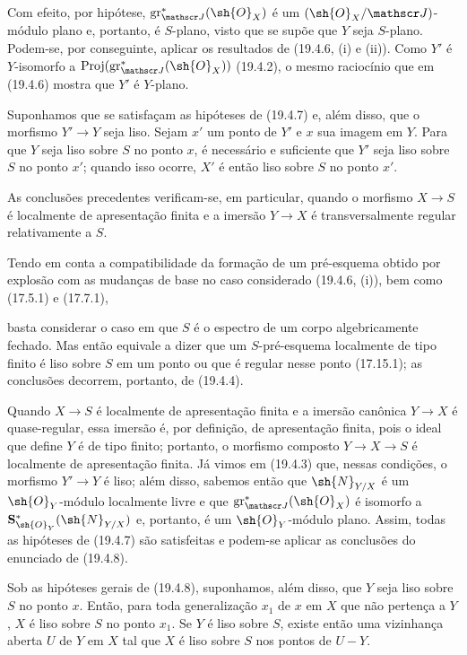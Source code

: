 Com efeito, por hipótese, $\operatorname{gr}_{\mathscr J}^*(\sh{O}_X)$ é um $(\sh{O}_X/\mathscr J)$-módulo plano e, portanto, é $S$-plano, visto que se supõe que $Y$ seja $S$-plano. Podem-se, por conseguinte, aplicar os resultados de (19.4.6, (i) e (ii)). Como $Y'$ é $Y$-isomorfo a $\operatorname{Proj}(\operatorname{gr}_{\mathscr J}^*(\sh{O}_X))$ (19.4.2), o mesmo raciocínio que em (19.4.6) mostra que $Y'$ é $Y$-plano.

\begin{proposition}[19.4.8]
\label{IV.19.4.8}
Suponhamos que se satisfaçam as hipóteses de (19.4.7) e, além disso, que o morfismo $Y'\to Y$ seja liso. Sejam $x'$ um ponto de $Y'$ e $x$ sua imagem em $Y$. Para que $Y$ seja liso sobre $S$ no ponto $x$, é necessário e suficiente que $Y'$ seja liso sobre $S$ no ponto $x'$; quando isso ocorre, $X'$ é então liso sobre $S$ no ponto $x'$.

As conclusões precedentes verificam-se, em particular, quando o morfismo $X\to S$ é localmente de apresentação finita e a imersão $Y\to X$ é transversalmente regular relativamente a $S$.
\end{proposition}

Tendo em conta a compatibilidade da formação de um pré-esquema obtido por explosão com as mudanças de base no caso considerado (19.4.6, (i)), bem como (17.5.1) e (17.7.1),


basta considerar o caso em que $S$ é o espectro de um corpo algebricamente fechado. Mas então equivale a dizer que um $S$-pré-esquema localmente de tipo finito é liso sobre $S$ em um ponto ou que é regular nesse ponto (17.15.1); as conclusões decorrem, portanto, de (19.4.4).

Quando $X\to S$ é localmente de apresentação finita e a imersão canônica $Y\to X$ é quase-regular, essa imersão é, por definição, de apresentação finita, pois o ideal que define $Y$ é de tipo finito; portanto, o morfismo composto $Y\to X\to S$ é localmente de apresentação finita. Já vimos em (19.4.3) que, nessas condições, o morfismo $Y'\to Y$ é liso; além disso, sabemos então que $\sh{N}_{Y/X}$ é um $\sh{O}_Y$-módulo localmente livre e que $\operatorname{gr}_{\mathscr J}^*(\sh{O}_X)$ é isomorfo a $\mathbf S_{\sh{O}_Y}^*(\sh{N}_{Y/X})$ e, portanto, é um $\sh{O}_Y$-módulo plano. Assim, todas as hipóteses de (19.4.7) são satisfeitas e podem-se aplicar as conclusões do enunciado de (19.4.8).

\begin{corollary}[19.4.9]
\label{IV.19.4.9}
Sob as hipóteses gerais de (19.4.8), suponhamos, além disso, que $Y$ seja liso sobre $S$ no ponto $x$. Então, para toda generalização $x_1$ de $x$ em $X$ que não pertença a $Y$, $X$ é liso sobre $S$ no ponto $x_1$. Se $Y$ é liso sobre $S$, existe então uma vizinhança aberta $U$ de $Y$ em $X$ tal que $X$ é liso sobre $S$ nos pontos de $U-Y$.
\end{corollary}


